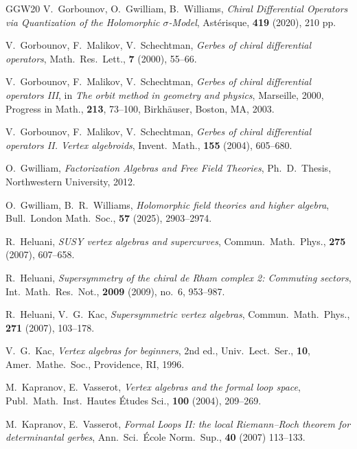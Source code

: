 \documentclass[final,reqno]{amsart}
\numberwithin{equation}{section}
\theoremstyle{definition}
\begin{document}
\begin{thebibliography}{GGW20}
V.\ Gorbounov, O.\ Gwilliam, B.\ Williams,
\textit{Chiral Differential Operators via Quantization of the Holomorphic $\sigma$-Model},
Ast\'{e}risque, \textbf{419} (2020), 210 pp.

V.\ Gorbounov, F.\ Malikov, V.\ Schechtman, 
\textit{Gerbes of chiral differential operators},
Math.\ Res.\ Lett., \textbf{7} (2000), 55--66.

V.\ Gorbounov, F.\ Malikov, V.\ Schechtman, 
\textit{Gerbes of chiral differential operators III}, in 
\textit{The orbit method in geometry and physics}, Marseille, 2000, 
Progress in Math., \textbf{213}, 73--100, 
Birkh\"auser, Boston, MA, 2003.

V.\ Gorbounov, F.\ Malikov, V.\ Schechtman, 
\textit{Gerbes of chiral differential operators II. Vertex algebroids}, 
Invent.\ Math., \textbf{155} (2004), 605--680.

O.\ Gwilliam, 
\textit{Factorization Algebras and Free Field Theories}, 
Ph.\ D.\ Thesis, Northwestern University, 2012. 

O.\ Gwilliam, B.\ R.\ Williams, 
\textit{Holomorphic field theories and higher algebra},
Bull.\ London Math.\ Soc., \textbf{57} (2025), 2903--2974.

R.\ Heluani, 
\emph{SUSY vertex algebras and supercurves}, 
Commun.\ Math.\ Phys., \textbf{275} (2007), 607--658.

R.\ Heluani, 
\emph{Supersymmetry of the chiral de Rham complex 2: Commuting sectors}, 
Int.\ Math.\ Res.\ Not., \textbf{2009} (2009), no.\ 6, 953--987.

R.\ Heluani, V.\ G.\ Kac,
\emph{Supersymmetric vertex algebras},  
Commun.\ Math.\ Phys., \textbf{271} (2007), 103--178.

V.\ G.\ Kac, 
\textit{Vertex algebras for beginners}, 2nd ed., 
Univ.\ Lect.\ Ser., \textbf{10}, 
Amer.\ Mathe.\ Soc., Providence, RI, 1996.

M.\ Kapranov, E.\ Vasserot,
\textit{Vertex algebras and the formal loop space}, 
Publ.\ Math.\ Inst.\ Hautes \'{E}tudes Sci., 
\textbf{100} (2004), 209--269.

M.\ Kapranov, E.\ Vasserot,
\textit{Formal Loops II: the local Riemann--Roch theorem for determinantal gerbes}, 
Ann.\ Sci.\ \'{E}cole Norm.\ Sup., \textbf{40} (2007) 113--133.


\end{thebibliography}
\end{document}

